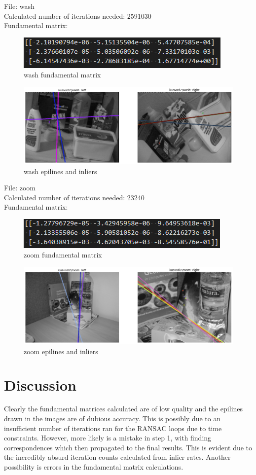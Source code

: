 \documentclass[10pt,a4paper]{article}
\begin{document}
File: wash\\
Calculated number of iterations needed: 2591030\\
Fundamental matrix:
\begin{figure}[H]
	\centering
	\includegraphics[width=0.7\linewidth]{img/washf}
	\caption{wash fundamental matrix}
	\label{fig:washf}
\end{figure}
\begin{figure}[H]
	\centering
	\includegraphics[width=0.7\linewidth]{img/wash}
	\caption{wash epilines and inliers}
	\label{fig:wash}
\end{figure}

File: zoom\\
Calculated number of iterations needed: 23240\\
Fundamental matrix:
\begin{figure}[H]
	\centering
	\includegraphics[width=0.7\linewidth]{img/zoomf}
	\caption{zoom fundamental matrix}
	\label{fig:zoomf}
\end{figure}
\begin{figure}[H]
	\centering
	\includegraphics[width=0.7\linewidth]{img/zoom}
	\caption{zoom epilines and inliers}
	\label{fig:zoom}
\end{figure}

\newpage
\section{Discussion}
Clearly the fundamental matrices calculated are of low quality and the epilines drawn in the images are of dubious accuracy. This is possibly due to an insufficient number of iterations ran for the RANSAC loops due to time constraints. However, more likely is a mistake in step 1, with finding correspondences which then propagated to the final results. This is evident due to the incredibly absurd iteration counts calculated from inlier rates. Another possibility is errors in the fundamental matrix calculations.
\end{document}
